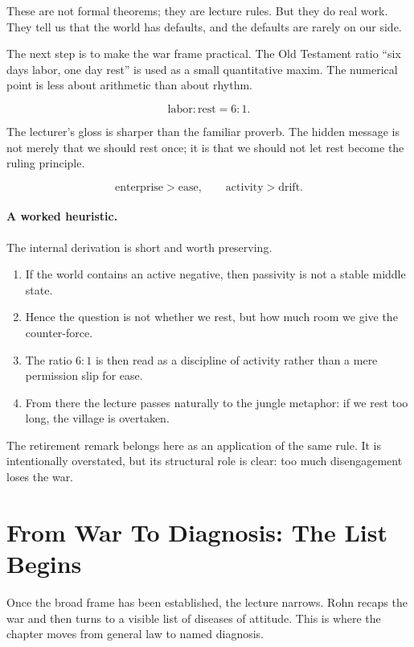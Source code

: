 These are not formal theorems; they are lecture rules. But they do real work. They tell us that the world has defaults, and the defaults are rarely on our side.

The next step is to make the war frame practical. The Old Testament ratio ``six days labor, one day rest'' is used as a small quantitative maxim. The numerical point is less about arithmetic than about rhythm.

\begin{equation}
\text{labor}:\text{rest} = 6:1.
\end{equation}

The lecturer's gloss is sharper than the familiar proverb. The hidden message is not merely that we should rest once; it is that we should not let rest become the ruling principle.

\begin{equation}
\text{enterprise} > \text{ease}, \qquad \text{activity} > \text{drift}.
\end{equation}

\paragraph{A worked heuristic.}
The internal derivation is short and worth preserving.
\begin{enumerate}
\item If the world contains an active negative, then passivity is not a stable middle state.
\item Hence the question is not whether we rest, but how much room we give the counter-force.
\item The ratio \(6:1\) is then read as a discipline of activity rather than a mere permission slip for ease.
\item From there the lecture passes naturally to the jungle metaphor: if we rest too long, the village is overtaken.
\end{enumerate}

The retirement remark belongs here as an application of the same rule. It is intentionally overstated, but its structural role is clear: too much disengagement loses the war.

\section{From War To Diagnosis: The List Begins}

Once the broad frame has been established, the lecture narrows. Rohn recaps the war and then turns to a visible list of diseases of attitude. This is where the chapter moves from general law to named diagnosis.

